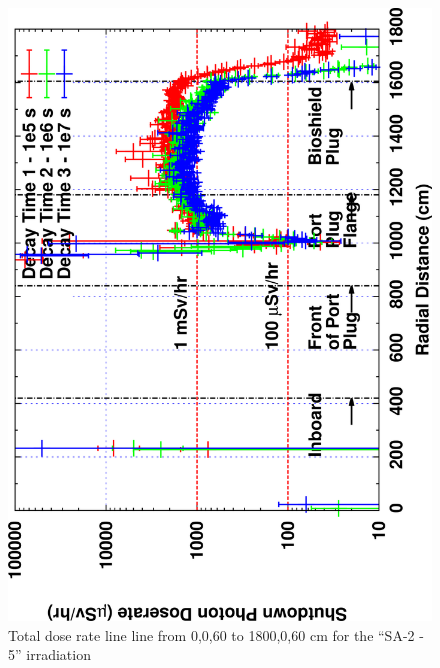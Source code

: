 \documentclass[12pt]{article}
\begin{document}
\begin{figure}[ht!]
\centering
\includegraphics[clip,scale=0.12,angle=-90]{../plots/photon_lineout/10yr/no-b4c_10yr.png}
\caption{Total dose rate line line from 0,0,60 to 1800,0,60 cm for the ``SA-2 - 5'' irradiation}
\label{fig:photons_10y_nob4c_dose}
\end{figure}
\clearpage
\newpage
\end{document}
